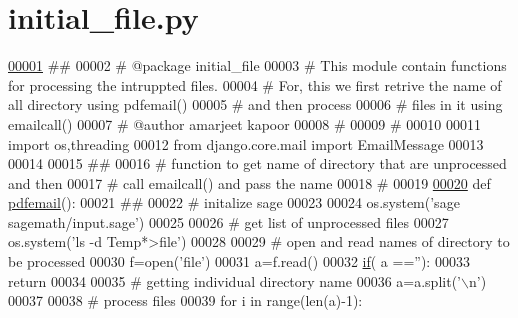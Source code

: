 \hypertarget{initial__file_8py_source}{}\section{initial\+\_\+file.\+py}
\label{initial__file_8py_source}

\begin{DoxyCode}
\hypertarget{initial__file_8py_source_l00001}{}\hyperlink{namespaceinitial__file}{00001} \textcolor{comment}{##}
00002 \textcolor{comment}{# @package initial\_file}
00003 \textcolor{comment}{# This module contain functions for processing the intruppted files.}
00004 \textcolor{comment}{# For, this we first retrive the name of all directory  using pdfemail()}
00005 \textcolor{comment}{# and then process}
00006 \textcolor{comment}{# files in it using emailcall()}
00007 \textcolor{comment}{# @author amarjeet kapoor}
00008 \textcolor{comment}{#}
00009 \textcolor{comment}{#}
00010 
00011 \textcolor{keyword}{import} os,threading
00012 \textcolor{keyword}{from} django.core.mail \textcolor{keyword}{import} EmailMessage
00013 
00014 
00015 \textcolor{comment}{##}
00016 \textcolor{comment}{# function to get name of directory that are unprocessed and then}
00017 \textcolor{comment}{# call emailcall() and pass the name}
00018 \textcolor{comment}{#}
00019 
\hypertarget{initial__file_8py_source_l00020}{}\hyperlink{namespaceinitial__file_a105b1aa7bf4db853b6f4d064ed224030}{00020} \textcolor{keyword}{def }\hyperlink{namespaceinitial__file_a105b1aa7bf4db853b6f4d064ed224030}{pdfemail}():
00021     \textcolor{comment}{##}
00022     \textcolor{comment}{# initalize sage}
00023 
00024     os.system(\textcolor{stringliteral}{'sage sagemath/input.sage'})
00025 
00026     \textcolor{comment}{# get list of unprocessed files}
00027     os.system(\textcolor{stringliteral}{'ls -d Temp*>file'})
00028 
00029     \textcolor{comment}{# open and read names of directory to be processed}
00030     f=open(\textcolor{stringliteral}{'file'})
00031     a=f.read()
00032     \hyperlink{bootstrap_8min_8js_ac2d69f5011896c6ed4a54e0dd36f6334}{if}( a ==\textcolor{stringliteral}{''}):
00033         \textcolor{keywordflow}{return}
00034 
00035     \textcolor{comment}{# getting individual directory name}
00036     a=a.split(\textcolor{stringliteral}{'\(\backslash\)n'})
00037 
00038     \textcolor{comment}{# process files}
00039     \textcolor{keywordflow}{for} i \textcolor{keywordflow}{in} range(len(a)-1):

\end{DoxyCode}
